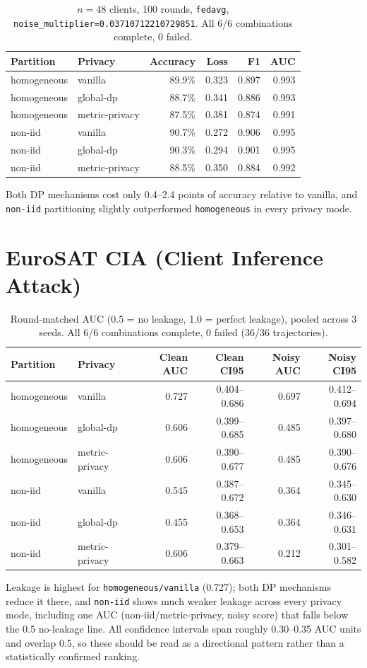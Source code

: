 \documentclass[11pt]{article}
\newcommand{\code}[1]{\texttt{#1}}
\begin{document}
\begin{table}[h!]
\centering
\begin{tabular}{llrrrr}
\toprule
Partition & Privacy & Accuracy & Loss & F1 & AUC \\
\midrule
homogeneous & vanilla & 89.9\% & 0.323 & 0.897 & 0.993 \\
homogeneous & global-dp & 88.7\% & 0.341 & 0.886 & 0.993 \\
homogeneous & metric-privacy & 87.5\% & 0.381 & 0.874 & 0.991 \\
non-iid & vanilla & 90.7\% & 0.272 & 0.906 & 0.995 \\
non-iid & global-dp & 90.3\% & 0.294 & 0.901 & 0.995 \\
non-iid & metric-privacy & 88.5\% & 0.350 & 0.884 & 0.992 \\
\bottomrule
\end{tabular}
\caption*{$n=48$ clients, 100 rounds, \code{fedavg}, \code{noise\_multiplier=0.03710712210729851}.
All 6/6 combinations complete, 0 failed.}
\end{table}

\noindent
Both DP mechanisms cost only 0.4--2.4 points of accuracy relative to vanilla, and \code{non-iid}
partitioning slightly outperformed \code{homogeneous} in every privacy mode.

\section*{EuroSAT CIA (Client Inference Attack)}

\begin{table}[h!]
\centering
\begin{tabular}{llrrrr}
\toprule
Partition & Privacy & Clean AUC & Clean CI95 & Noisy AUC & Noisy CI95 \\
\midrule
homogeneous & vanilla & 0.727 & 0.404--0.686 & 0.697 & 0.412--0.694 \\
homogeneous & global-dp & 0.606 & 0.399--0.685 & 0.485 & 0.397--0.680 \\
homogeneous & metric-privacy & 0.606 & 0.390--0.677 & 0.485 & 0.390--0.676 \\
non-iid & vanilla & 0.545 & 0.387--0.672 & 0.364 & 0.345--0.630 \\
non-iid & global-dp & 0.455 & 0.368--0.653 & 0.364 & 0.346--0.631 \\
non-iid & metric-privacy & 0.606 & 0.379--0.663 & 0.212 & 0.301--0.582 \\
\bottomrule
\end{tabular}
\caption*{Round-matched AUC (0.5 = no leakage, 1.0 = perfect leakage), pooled across 3 seeds.
All 6/6 combinations complete, 0 failed (36/36 trajectories).}
\end{table}

\noindent
Leakage is highest for \code{homogeneous/vanilla} (0.727); both DP mechanisms reduce it there,
and \code{non-iid} shows much weaker leakage across every privacy mode, including one AUC
(non-iid/metric-privacy, noisy score) that falls below the 0.5 no-leakage line. All confidence
intervals span roughly 0.30--0.35 AUC units and overlap 0.5, so these should be read as a
directional pattern rather than a statistically confirmed ranking.
\end{document}
